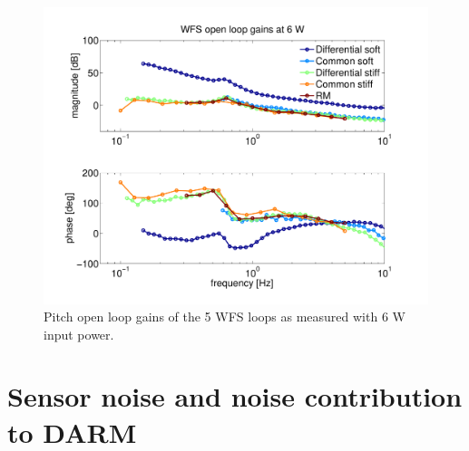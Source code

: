 



\begin{figure}
\begin{centering}
\includegraphics[width=0.8\columnwidth]{figures/olgs6W.pdf}
\caption{Pitch open loop gains of the 5 WFS loops as measured with 6 W
  input power.}
\label{fig:olgs6W}
\end{centering}
\end{figure}



\section{Sensor noise and noise contribution to DARM}


